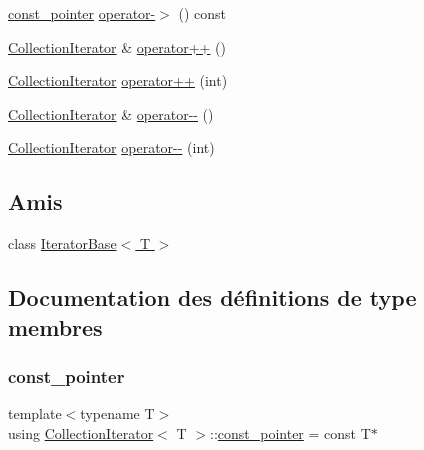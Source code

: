 \begin{DoxyCompactItemize}
\item 
\hyperlink{class_collection_iterator_a9bff5744ce1cfc8f704fa52557699594}{const\+\_\+pointer} \hyperlink{class_collection_iterator_a1892f0cf674eaad4c9d02bfcda128eb3}{operator-\/$>$} () const
\item 
\hyperlink{class_collection_iterator}{Collection\+Iterator} \& \hyperlink{class_collection_iterator_aa570334105e0d8e3a46866a16bce3548}{operator++} ()
\item 
\hyperlink{class_collection_iterator}{Collection\+Iterator} \hyperlink{class_collection_iterator_a8349a131a3a073abc5e09c50f4c56824}{operator++} (int)
\item 
\hyperlink{class_collection_iterator}{Collection\+Iterator} \& \hyperlink{class_collection_iterator_aa46a032f274c435cc87ed6ac14742ffa}{operator-\/-\/} ()
\item 
\hyperlink{class_collection_iterator}{Collection\+Iterator} \hyperlink{class_collection_iterator_ac7ffeb12a633924c11852e6d12a1e1b6}{operator-\/-\/} (int)
\end{DoxyCompactItemize}
\subsection*{Amis}
\begin{DoxyCompactItemize}
\item 
class \hyperlink{class_collection_iterator_a6076dfcb85a3a7cb903b827fa821fe54}{Iterator\+Base$<$ T $>$}
\end{DoxyCompactItemize}


\subsection{Documentation des définitions de type membres}
\mbox{\label{class_collection_iterator_a9bff5744ce1cfc8f704fa52557699594}} 
\subsubsection{\texorpdfstring{const\+\_\+pointer}{const\_pointer}}
{\footnotesize\ttfamily template$<$typename T$>$ \\
using \hyperlink{class_collection_iterator}{Collection\+Iterator}$<$ T $>$\+::\hyperlink{class_collection_iterator_a9bff5744ce1cfc8f704fa52557699594}{const\+\_\+pointer} =  const T$\ast$}

